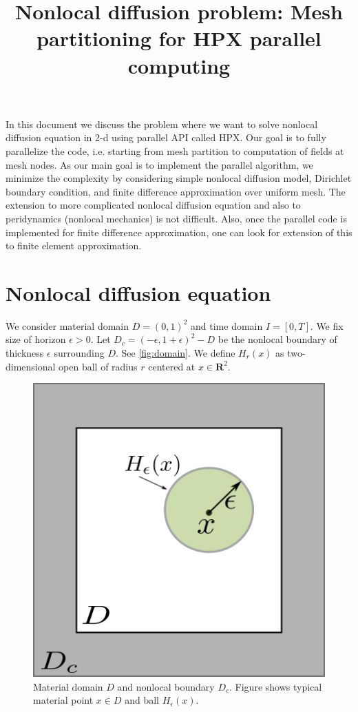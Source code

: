 \documentclass[11pt,twocolumn]{amsart}
\theoremstyle{definition}
\theoremstyle{definition}
\numberwithin{equation}{section}
\numberwithin{equation}{section}
\newcommand{\R}{\mathbf{R}}  %
\begin{document}
\title{Nonlocal diffusion problem: Mesh partitioning for HPX parallel computing}

\maketitle

In this document we discuss the problem where we want to solve nonlocal diffusion equation in 2-d using parallel API called HPX. Our goal is to fully parallelize the code, i.e. starting from mesh partition to computation of fields at mesh nodes. As our main goal is to implement the parallel algorithm, we minimize the complexity by considering simple nonlocal diffusion model, Dirichlet boundary condition, and finite difference approximation over uniform mesh. The extension to more complicated nonlocal diffusion equation and also to peridynamics (nonlocal mechanics) is not difficult. Also, once the parallel code is implemented for finite difference approximation, one can look for extension of this to finite element approximation.

\section{Nonlocal diffusion equation}
We consider material domain $D = (0,1)^2$ and time domain $I = [0,T]$. We fix size of horizon $\epsilon>0$. Let $D_c = (-\epsilon, 1+\epsilon)^2 - D$ be the nonlocal boundary of thickness $\epsilon$ surrounding $D$. See \autoref{fig:domain}. We define $H_r(x)$ as two-dimensional open ball of radius $r$ centered at $x\in \R^2$.

\begin{figure}
\centering
\includegraphics[scale=0.5]{material_domain.png}
\caption{Material domain $D$ and nonlocal boundary $D_c$. Figure shows typical material point $x\in D$ and ball $H_\epsilon(x)$. }\label{fig:domain}
\end{figure}
\end{document}

